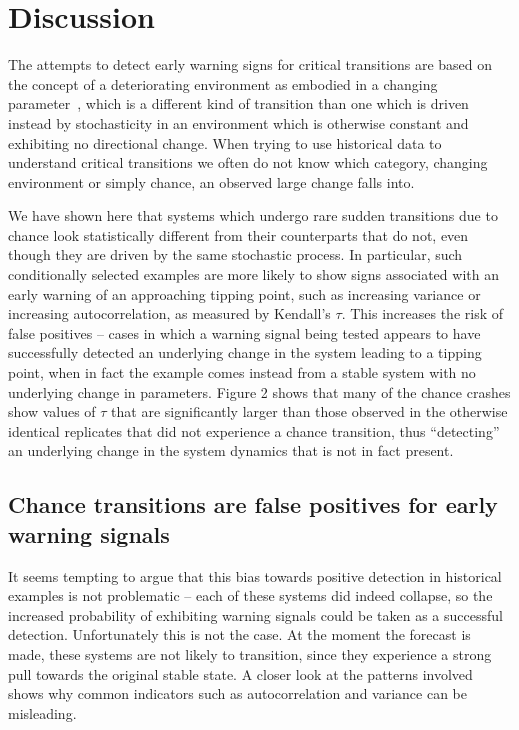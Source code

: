 \documentclass[authoryear,review,12pt]{elsarticle}
\begin{document}
\section{Discussion}


The attempts to detect early warning signs for critical transitions
are based on the concept of a deteriorating environment as embodied
in a changing parameter~\cite{Scheffer2009}, which is a different kind
of transition than one which is driven instead by stochasticity in an
environment which is otherwise constant and exhibiting no directional
change. When trying to use historical data to understand critical
transitions we often do not know which category, changing environment
or simply chance, an observed large change falls into.

We have shown here that systems which undergo rare sudden transitions
due to chance look statistically different from their counterparts that
do not, even though they are driven by the same stochastic process.
In particular, such conditionally selected examples are more likely to
show signs associated with an early warning of an approaching tipping
point, such as increasing variance or increasing autocorrelation,
as measured by Kendall's $\tau$.  This increases the risk of false
positives -- cases in which a warning signal being tested appears to
have successfully detected an underlying change in the system leading
to a tipping point, when in fact the example comes instead from a stable
system with no underlying change in parameters. Figure 2 shows that many
of the chance crashes show values of $\tau$ that are significantly larger
than those observed in the otherwise identical replicates that did not
experience a chance transition, thus ``detecting'' an underlying change
in the system dynamics that is not in fact present.




\subsection{Chance transitions are false positives for early warning signals}

It seems tempting to argue that this bias towards positive detection
in historical examples is not problematic -- each of these systems did
indeed collapse, so the increased probability of exhibiting warning
signals could be taken as a successful detection.  Unfortunately this is
not the case. At the moment the forecast is made, these systems are not
likely to transition, since they experience a strong pull towards the
original stable state.  A closer look at the patterns involved shows why
common indicators such as autocorrelation and variance can be misleading.
\end{document}
